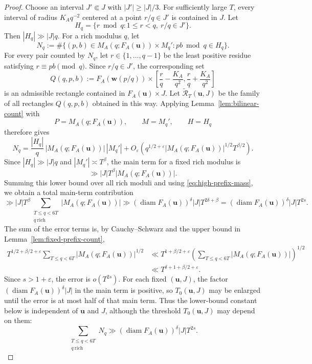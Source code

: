 \documentclass[11pt]{amsart}
\newcommand{\eps}{\varepsilon}
\newcommand{\diam}{\operatorname{diam}}
\begin{document}
\begin{proof}
Choose an interval $J'\Subset J$ with $|J'|\ge |J|/3$.  For sufficiently
large $T$, every interval of radius $K_Aq^{-2}$ centered at a point
$r/q\in J'$ is contained in $J$.  Let
$$
 H_q=\{r\bmod q:1\le r<q,\ r/q\in J'\}.
$$
Then $|H_q|\gg |J|q$.  For a rich modulus $q$, let
$$
 N_q:=\#\{(p,b)\in M_A(q;F_A(\mathbf{u}))\times M_q': pb\bmod q\in H_q\}.
$$
For every pair counted by $N_q$, let $r\in\{1,\ldots,q-1\}$ be the least
positive residue satisfying $r\equiv pb\pmod q$.  Since $r/q\in J'$, the corresponding set
$$
 Q(q,p,b):=F_A(\mathbf{w}(p/q))\times
 \left[\frac rq-\frac{K_A}{q^2},\frac rq+\frac{K_A}{q^2}\right]
$$
is an admissible rectangle contained in $F_A(\mathbf{u})\times J$.  Let
$\widetilde{\mathcal R}_T(\mathbf{u},J)$ be the family of all rectangles $Q(q,p,b)$
obtained in this way.  Applying Lemma~\ref{lem:bilinear-count} with
$$
 P=M_A(q;F_A(\mathbf{u})),\qquad M=M_q',\qquad H=H_q
$$
therefore gives
$$
 N_q=\frac{|H_q|}{q}\,|M_A(q;F_A(\mathbf{u}))|\,|M_q'|
 +O_\eps\!\left(q^{1/2+\eps}|M_A(q;F_A(\mathbf{u}))|^{1/2}T^{\beta/2}\right).
$$
Since $|H_q|\gg |J|q$ and $|M_q'|\asymp T^\beta$, the main term for a
fixed rich modulus is
$$
 \gg |J|T^\beta|M_A(q;F_A(\mathbf{u}))|.
$$
Summing this lower bound over all rich moduli and using
\eqref{eq:high-prefix-mass}, we obtain a total main-term contribution
$$
 \gg |J|T^\beta\sum_{\substack{T\le q<6T\\ q\ \mathrm{rich}}}|M_A(q;F_A(\mathbf{u}))|
 \gg (\diam F_A(\mathbf{u}))^\delta |J|T^{2\delta+\beta}
 =(\diam F_A(\mathbf{u}))^\delta |J|T^{2s}.
$$
The sum of the error terms is, by Cauchy--Schwarz and the upper bound in
Lemma~\ref{lem:fixed-prefix-count},
\begin{align*}
 T^{1/2+\beta/2+\eps}
 \sum_{T\le q<6T}|M_A(q;F_A(\mathbf{u}))|^{1/2}
 &\ll T^{1+\beta/2+\eps}
 \left(\sum_{T\le q<6T}|M_A(q;F_A(\mathbf{u}))|\right)^{1/2}\\
 &\ll T^{\delta+1+\beta/2+\eps}.
\end{align*}
Since $s>1+\eps$, the error is $o(T^{2s})$.  For each fixed
$(\mathbf{u},J)$, the factor $(\diam F_A(\mathbf{u}))^\delta|J|$ in the
main term is positive, so $T_0(\mathbf{u},J)$ may be enlarged until the error
is at most half of that main term.  Thus the lower-bound constant below is
independent of $\mathbf{u}$ and $J$, although the threshold $T_0(\mathbf{u},J)$
may depend on them:
$$
 \sum_{\substack{T\le q<6T\\q\ \mathrm{rich}}}N_q
 \gg (\diam F_A(\mathbf{u}))^\delta |J|T^{2s}.
$$


\end{proof}
\end{document}
